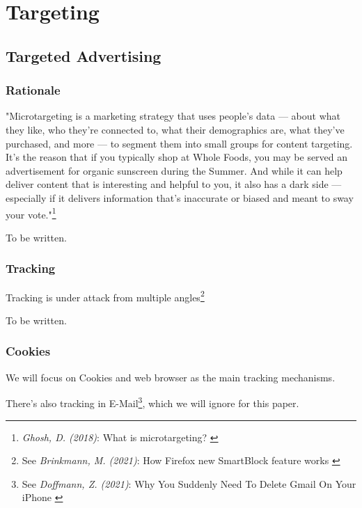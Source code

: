 %
%

\pagebreak
\section{Targeting}

\onehalfspacing

\subsection{Targeted Advertising}

\subsubsection{Rationale}

"Microtargeting is a marketing strategy that uses people’s data — about what they like, who they’re connected to, what their demographics are, what they’ve purchased, and more — to segment them into small groups for content targeting. It’s the reason that if you typically shop at Whole Foods, you may be served an advertisement for organic sunscreen during the Summer. And while it can help deliver content that is interesting and helpful to you, it also has a dark side — especially if it delivers information that’s inaccurate or biased and meant to sway your vote."\footnote{\textit{Ghosh, D. (2018)}: What is microtargeting? \cite{mozillaBlog}}

To be written.

\subsubsection{Tracking}

Tracking is under attack from multiple angles\footnote{See \textit{Brinkmann, M. (2021)}: How Firefox new SmartBlock feature works \cite{mozillaBlog}}

To be written.

\subsubsection{Cookies}

We will focus on Cookies and web browser as the main tracking mechanisms.

There's also tracking in E-Mail\footnote{See \textit{Doffmann, Z. (2021)}: Why You Suddenly Need To Delete Gmail On Your iPhone \cite{deleteGmail}}, which we will ignore for this paper.

